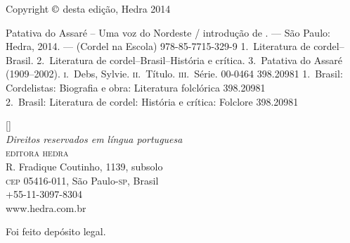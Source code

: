 
\clearpage

\begingroup
\centering
\footnotesize

Copyright $\copyright$ desta edição, Hedra 2014\\\medskip

%
%
%


%
{Patativa do Assaré -- Uma voz do Nordeste / introdução de \introdutor. --- São Paulo: Hedra, 2014. --- (Cordel na Escola)}
{978-85-7715-329-9}%
{1.~Literatura de cordel--Brasil. 2.~Literatura de
cordel--Brasil--História e crítica. 3.~Patativa do Assaré
(1909--2002). \textsc{i}.~Debs, Sylvie. \textsc{ii}.~Título.
\textsc{iii}.~Série.}%
{00-0464}%
{398.20981}%
{1.~Brasil: Cordelistas: Biografia e obra: Literatura folclórica 398.20981\\
2.~Brasil: Literatura de cordel: História e crítica: Folclore 398.20981}

\vfill

[\the\year]\\
\textit{Direitos reservados em língua portuguesa}\\
\textsc{editora hedra}\\
R. Fradique Coutinho, 1139, subsolo\\
\textsc{cep} 05416-011,  São Paulo-\textsc{sp}, Brasil\\
+55-11-3097-8304\\ 
www.hedra.com.br\\\smallskip

Foi feito depósito legal.

\par
\endgroup
\clearpage
